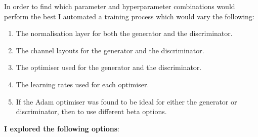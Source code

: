\documentclass{UoYCSproject}
\begin{document}
In order to find which parameter and hyperparameter combinations would perform the best I automated a training process which would vary the following:
\begin{enumerate}
\item The normalisation layer for both the generator and the discriminator.
\item The channel layouts for the generator and the discriminator.
\item The optimiser used for the generator and the discriminator.
\item The learning rates used for each optimiser.
\item If the Adam optimiser was found to be ideal for either the generator or discriminator, then to use different beta options.
\end{enumerate}

\textbf{I explored the following options}:
\end{document}
